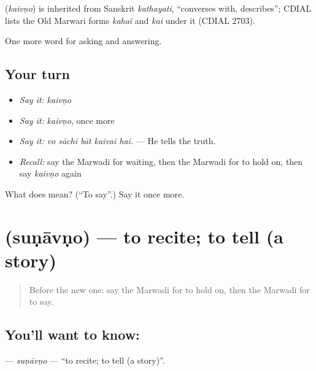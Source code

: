 \begin{cousinweb}
\textbf{} (\emph{kaivṇo}) is inherited from Sanskrit \emph{kathayati}, \textquotedblleft{}converses with, describes\textquotedblright{}; CDIAL lists the Old Marwari forms \emph{kahaï} and \emph{kai} under it (CDIAL 2703).
\end{cousinweb}

\begin{grammarlens}[title={What you've built}]
One more word for asking and answering.
\end{grammarlens}

\subsection*{Your turn}
\begin{itemize}
\raggedright
  \item \emph{Say it:} \emph{kaivṇo}
  \item \emph{Say it:} \emph{kaivṇo}, once more
  \item \emph{Say it:} \emph{vo sāchī bāt kaivai hai.} — He tells the truth.
  \item \emph{Recall:} say the Marwadi for waiting, then the Marwadi for to hold on, then say \emph{kaivṇo} again
\end{itemize}

\begin{tcolorbox}[breakable,colback=teal!4,colframe=teal!35!black,title={Before you move on}]
What does  mean? (\textquotedblleft{}To say\textquotedblright{}.) Say it once more.
\end{tcolorbox}
\section[\texorpdfstring{\mw{सुणावणो} (suṇāvṇo)}{सुणावणो (suṇāvṇo)}]{ (suṇāvṇo) — to recite; to tell (a story)}

\label{lesson:MW-C268-sunavno}



\begin{quote}
Before the new one: say the Marwadi for to hold on, then the Marwadi for to say.
\end{quote}

\subsection*{You'll want to know: }
\textbf{} — \emph{suṇāvṇo} — \textquotedblleft{}to recite; to tell (a story)\textquotedblright{}.

